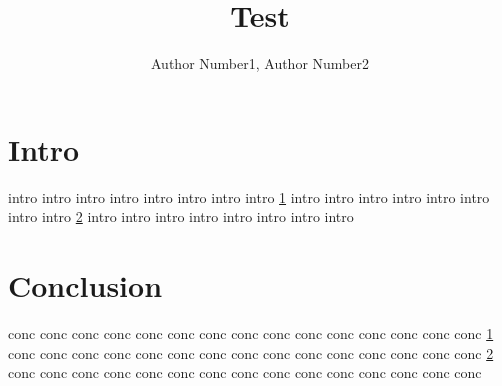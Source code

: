 \documentclass{article}
\begin{document}
\title{Test}
\author{Author Number1, Author Number2}
\date{}

\maketitle

\section{Intro}
\label{sec:intro}

intro intro intro intro 
intro intro intro intro
\cref{sec:intro}
intro intro intro intro 
intro intro intro intro
\cref{sec:conc}
intro intro intro intro 
intro intro intro intro

\section{Conclusion}
\label{sec:conc}

conc conc conc conc conc
conc conc conc conc conc
conc conc conc conc conc
\cref{sec:intro}
conc conc conc conc conc
conc conc conc conc conc
conc conc conc conc conc
\cref{sec:conc}
conc conc conc conc conc
conc conc conc conc conc
conc conc conc conc conc
\end{document}
